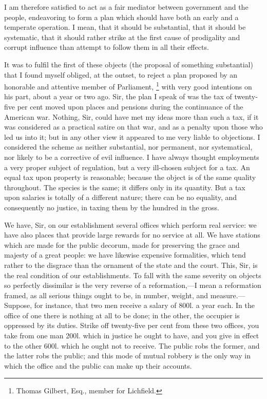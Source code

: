 I am therefore satisfied to act as a fair mediator between government and the people, endeavoring to form a plan which should have both an early and a temperate operation. I mean, that it should be substantial, that it should be systematic, that it should rather strike at the first cause of prodigality and corrupt influence than attempt to follow them in all their effects.

It was to fulfil the first of these objects (the proposal of something substantial) that I found myself obliged, at the outset, to reject a plan proposed by an honorable and attentive member of Parliament,
\footnote{Thomas Gilbert, Esq., member for Lichfield.}
with very good intentions on his part, about a year or two ago. Sir, the plan I speak of was the tax of twenty-five per cent moved upon places and pensions during the continuance of the American war. Nothing, Sir, could have met my ideas more than such a tax, if it was considered as a practical satire on that war, and as a penalty upon those who led us into it; but in any other view it appeared to me very liable to objections. I considered the scheme as neither substantial, nor permanent, nor systematical, nor likely to be a corrective of evil influence. I have always thought employments a very proper subject of regulation, but a very ill-chosen subject for a tax. An equal tax upon property is reasonable; because the object is of the same quality throughout. The species is the same; it differs only in its quantity. But a tax upon salaries is totally of a different nature; there can be no equality, and consequently no justice, in taxing them by the hundred in the gross.

We have, Sir, on our establishment several offices which perform real service: we have also places that provide large rewards for no service at all. We have stations which are made for the public decorum, made for preserving the grace and majesty of a great people: we have likewise expensive formalities, which tend rather to the disgrace than the ornament of the state and the court. This, Sir, is the real condition of our establishments. To fall with the same severity on objects so perfectly dissimilar is the very reverse of a reformation,—I mean a reformation framed, as all serious things ought to be, in number, weight, and measure.—Suppose, for instance, that two men receive a salary of 800l. a year each. In the office of one there is nothing at all to be done; in the other, the occupier is oppressed by its duties. Strike off twenty-five per cent from these two offices, you take from one man 200l. which in justice he ought to have, and you give in effect to the other 600l. which he ought not to receive. The public robs the former, and the latter robs the public; and this mode of mutual robbery is the only way in which the office and the public can make up their accounts.

